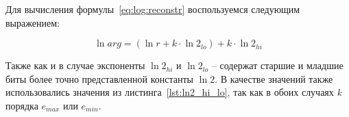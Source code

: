 Для вычисления формулы~\ref{eq:log:reconstr} воспользуемся следующим выражением:

\begin{equation}
    \ln{arg} = (\ln{r} + k \cdot \ln{2}_{lo}) + k \cdot \ln{2}_{hi}
\end{equation}

Также как и в случае экспоненты $\ln{2}_{hi}$ и $\ln{2}_{lo}$ -- содержат старшие и младшие биты более точно представленной константы $\ln{2}$.
В качестве значений также использовались значения из листинга~\ref{lst:ln2_hi_lo}, так как в обоих случаях \textit{k} порядка $e_{max}$ или $e_{min}$.